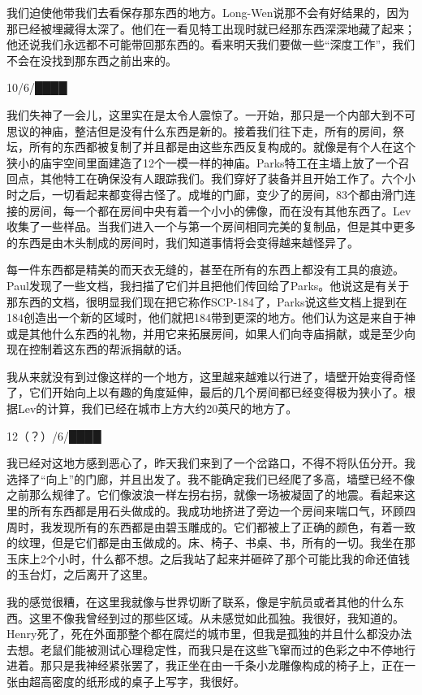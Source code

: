 我们迫使他带我们去看保存那东西的地方。Long-Wen说那不会有好结果的，因为那已经被埋藏得太深了。他们在一看见特工出现时就已经那东西深深地藏了起来；他还说我们永远都不可能带回那东西的。看来明天我们要做一些“深度工作”，我们不会在没找到那东西之前出来的。

\hr

10\slash 6\slash ████

我们失神了一会儿，这里实在是太令人震惊了。一开始，那只是一个内部大到不可思议的神庙，整洁但是没有什么东西是新的。接着我们往下走，所有的房间，祭坛，所有的东西都被复制了并且都是由这些东西反复构成的。就像是有个人在这个狭小的庙宇空间里面建造了12个一模一样的神庙。Parks特工在主墙上放了一个召回点，其他特工在确保没有人跟踪我们。我们穿好了装备并且开始工作了。六个小时之后，一切看起来都变得古怪了。成堆的门廊，变少了的房间，83个都由滑门连接的房间，每一个都在房间中央有着一个小小的佛像，而在没有其他东西了。Lev收集了一些样品。当我们进入一个与第一个房间相同完美的复制品，但是其中更多的东西是由木头制成的房间时，我们知道事情将会变得越来越怪异了。

每一件东西都是精美的而天衣无缝的，甚至在所有的东西上都没有工具的痕迹。Paul发现了一些文档，我扫描了它们并且把他们传回给了Parks。他说这是有关于那东西的文档，很明显我们现在把它称作SCP-184了，Parks说这些文档上提到在184创造出一个新的区域时，他们就把184带到更深的地方。他们认为这是来自于神或是其他什么东西的礼物，并用它来拓展房间，如果人们向寺庙捐献，或是至少向现在控制着这东西的帮派捐献的话。

我从来就没有到过像这样的一个地方，这里越来越难以行进了，墙壁开始变得奇怪了，它们开始向上以有趣的角度延伸，最后的几个房间都已经变得极为狭小了。根据Lev的计算，我们已经在城市上方大约20英尺的地方了。

\hr

12（？）\slash 6\slash ████

我已经对这地方感到恶心了，昨天我们来到了一个岔路口，不得不将队伍分开。我选择了“向上”的门廊，并且出发了。我不能确定我们已经爬了多高，墙壁已经不像之前那么规律了。它们像波浪一样左拐右拐，就像一场被凝固了的地震。看起来这里的所有东西都是用石头做成的。我成功地挤进了旁边一个房间来喘口气，环顾四周时，我发现所有的东西都是由碧玉雕成的。它们都被上了正确的颜色，有着一致的纹理，但是它们都是由玉做成的。床、椅子、书桌、书，所有的一切。我坐在那玉床上2个小时，什么都不想。之后我站了起来并砸碎了那个可能比我的命还值钱的玉台灯，之后离开了这里。

我的感觉很糟，在这里我就像与世界切断了联系，像是宇航员或者其他的什么东西。这里不像我曾经到过的那些区域。从未感觉如此孤独。我很好，我知道的。Henry死了，死在外面那整个都在腐烂的城市里，但我是孤独的并且什么都没办法去想。老鼠们能被测试心理稳定性，而我只是在这些飞窜而过的色彩之中不停地行进着。那只是我神经紧张罢了，我正坐在由一千条小龙雕像构成的椅子上，正在一张由超高密度的纸形成的桌子上写字，我很好。

